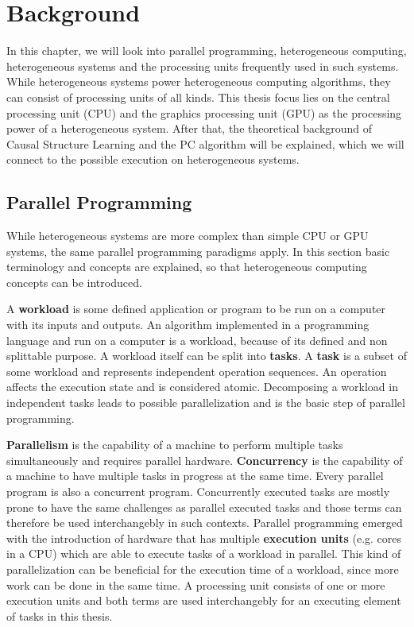 \chapter{Background}
In this chapter, we will look into parallel programming, heterogeneous computing, heterogeneous systems and the processing units frequently used in such systems. While heterogeneous systems power heterogeneous computing algorithms, they can consist of processing units of all kinds. This thesis focus lies on the central processing unit (CPU) and the graphics processing unit (GPU) as the processing power of a heterogeneous system.
After that, the theoretical background of Causal Structure Learning and the PC algorithm will be explained, which we will connect to the possible execution on heterogeneous systems.

\section{Parallel Programming}
While heterogeneous systems are more complex than simple CPU or GPU systems, the same parallel programming paradigms apply. In this section basic terminology and concepts are explained, so that heterogeneous computing concepts can be introduced.

A \textbf{workload} is some defined application or program to be run on a computer with its inputs and outputs. An algorithm implemented in a programming language and run on a computer is a workload, because of its defined and non splittable purpose. A workload itself can be split into \textbf{tasks}. A \textbf{task} is a subset of some workload and represents independent operation sequences. An operation affects the execution state and is considered atomic. Decomposing a workload in independent tasks leads to possible parallelization and is the basic step of parallel programming.

\textbf{Parallelism} is the capability of a machine to perform multiple tasks simultaneously and requires parallel hardware. \textbf{Concurrency} is the capability of a machine to have multiple tasks in progress at the same time. Every parallel program is also a concurrent program. Concurrently executed tasks are mostly prone to have the same challenges as parallel executed tasks and those terms can therefore be used interchangebly in such contexts. Parallel programming emerged with the introduction of hardware that has multiple \textbf{execution units} (e.g. cores in a CPU) which are able to execute tasks of a workload in parallel. This kind of parallelization can be beneficial for the execution time of a workload, since more work can be done in the same time. A processing unit consists of one or more execution units and both terms are used interchangebly for an executing element of tasks in this thesis.


